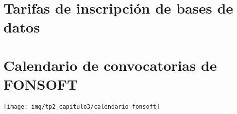\section{Tarifas de inscripción de bases de datos}
\label{anexo:tarifas-bases-de-datos}


\newpage
\section{Calendario de convocatorias de FONSOFT}
\label{anexo:calendario-fonsoft}
     \begin{sidewaysfigure}[h]
         \centering
\texttt{[image: img/tp2\_capitulo3/calendario-fonsoft]}
     \end{sidewaysfigure}


